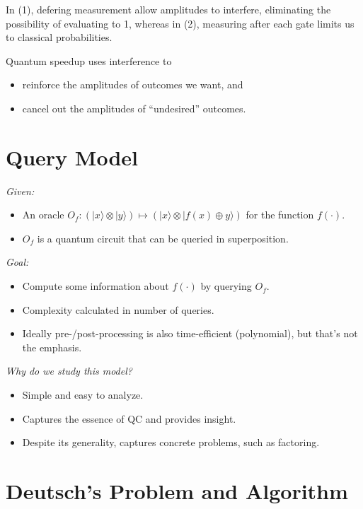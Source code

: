 \documentclass[11pt]{article}
\newcommand{\ket}[1]{|#1\rangle}
\newcommand{\makeroom}{\vspace{5mm}\noindent}
\begin{document}
\makeroom
In (1), defering measurement allow amplitudes to interfere, eliminating the
possibility of evaluating to 1, whereas in (2), measuring after each gate limits
us to classical probabilities.

\makeroom
Quantum speedup uses interference to
\begin{itemize}
\item reinforce the amplitudes of outcomes we want, and
\item cancel out the amplitudes of ``undesired'' outcomes.
\end{itemize}

\section{Query Model}

\textit{Given:}
\begin{itemize}
\item An oracle $O_f : (\ket{x}\otimes \ket{y}) \mapsto (\ket{x}\otimes \ket{f(x) \oplus y})$
      for the function $f(\cdot)$.
\item $O_f$ is a quantum circuit that can be queried in superposition.
\end{itemize}

\makeroom
\textit{Goal:}
\begin{itemize}
\item Compute some information about $f(\cdot)$ by querying $O_f$.
\item Complexity calculated in number of queries.
\item Ideally pre-/post-processing is also time-efficient (polynomial), but
      that's not the emphasis.
\end{itemize}

\makeroom
\textit{Why do we study this model?}
\begin{itemize}
\item Simple and easy to analyze.
\item Captures the essence of QC and provides insight.
\item Despite its generality, captures concrete problems, such as factoring.
\end{itemize}

\section{Deutsch's Problem and Algorithm}
\end{document}
